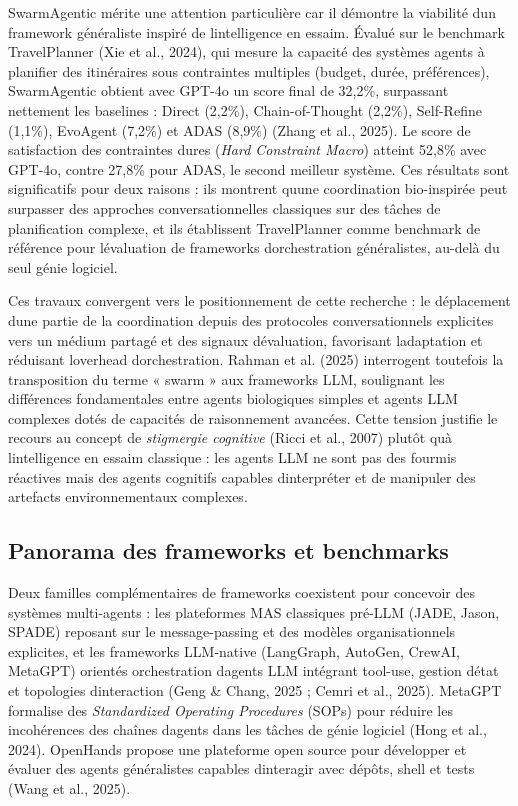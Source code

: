 \documentclass[12pt,a4paper]{article}
\begin{document}
SwarmAgentic mérite une attention particulière car il démontre la
viabilité d\textquotesingle un framework généraliste inspiré de
l\textquotesingle intelligence en essaim. Évalué sur le benchmark
TravelPlanner (Xie et al., 2024), qui mesure la capacité des systèmes
agents à planifier des itinéraires sous contraintes multiples
(budget, durée, préférences), SwarmAgentic obtient avec GPT-4o un score
final de 32,2\%, surpassant nettement les baselines : Direct (2,2\%),
Chain-of-Thought (2,2\%), Self-Refine (1,1\%), EvoAgent (7,2\%) et ADAS
(8,9\%) (Zhang et al., 2025). Le score de satisfaction des contraintes
dures (\emph{Hard Constraint Macro}) atteint 52,8\% avec GPT-4o, contre
27,8\% pour ADAS, le second meilleur système. Ces résultats sont
significatifs pour deux raisons : ils montrent qu\textquotesingle une
coordination bio-inspirée peut surpasser des approches
conversationnelles classiques sur des tâches de planification complexe,
et ils établissent TravelPlanner comme benchmark de référence pour
l\textquotesingle évaluation de frameworks d\textquotesingle orchestration
généralistes, au-delà du seul génie logiciel.

Ces travaux convergent vers le positionnement de cette recherche : le
déplacement d\textquotesingle une partie de la coordination depuis des
protocoles conversationnels explicites vers un médium partagé et des
signaux d\textquotesingle évaluation, favorisant
l\textquotesingle adaptation et réduisant l\textquotesingle overhead
d\textquotesingle orchestration. Rahman et al. (2025) interrogent
toutefois la transposition du terme « swarm » aux frameworks LLM,
soulignant les différences fondamentales entre agents biologiques
simples et agents LLM complexes dotés de capacités de raisonnement
avancées. Cette tension justifie le recours au concept de
\emph{stigmergie cognitive} (Ricci et al., 2007) plutôt qu\textquotesingle à
l\textquotesingle intelligence en essaim classique : les agents LLM ne
sont pas des fourmis réactives mais des agents cognitifs capables
d\textquotesingle interpréter et de manipuler des artefacts
environnementaux complexes.

\subsection{Panorama des frameworks et
benchmarks}\label{panorama-des-frameworks-et-benchmarks}

Deux familles complémentaires de frameworks coexistent pour concevoir
des systèmes multi-agents : les plateformes MAS classiques pré-LLM
(JADE, Jason, SPADE) reposant sur le message-passing et des modèles
organisationnels explicites, et les frameworks LLM-native (LangGraph,
AutoGen, CrewAI, MetaGPT) orientés orchestration
d\textquotesingle agents LLM intégrant tool-use, gestion
d\textquotesingle état et topologies d\textquotesingle interaction (Geng
\& Chang, 2025 ; Cemri et al., 2025). MetaGPT formalise des
\emph{Standardized Operating Procedures} (SOPs) pour réduire les
incohérences des chaînes d\textquotesingle agents dans les tâches de
génie logiciel (Hong et al., 2024). OpenHands propose une plateforme
open source pour développer et évaluer des agents généralistes capables
d\textquotesingle interagir avec dépôts, shell et tests (Wang et al.,
2025).
\end{document}
